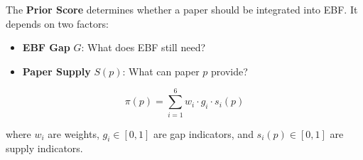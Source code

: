 
\begin{tcolorbox}[colback=blue!5!white, colframe=blue!75!black,
    title=\textbf{Definition 5: Prior Score $\pi: \mathcal{P} \to [0, 1]$ (Integration Decision)}]

The \textbf{Prior Score} determines whether a paper should be integrated into EBF.
It depends on two factors:
\begin{itemize}[nosep]
    \item \textbf{EBF Gap} $G$: What does EBF still need?
    \item \textbf{Paper Supply} $S(p)$: What can paper $p$ provide?
\end{itemize}

\begin{equation}
\pi(p) = \sum_{i=1}^{6} w_i \cdot g_i \cdot s_i(p)
\end{equation}

where $w_i$ are weights, $g_i \in [0,1]$ are gap indicators, and $s_i(p) \in [0,1]$ are supply indicators.

\end{tcolorbox}

